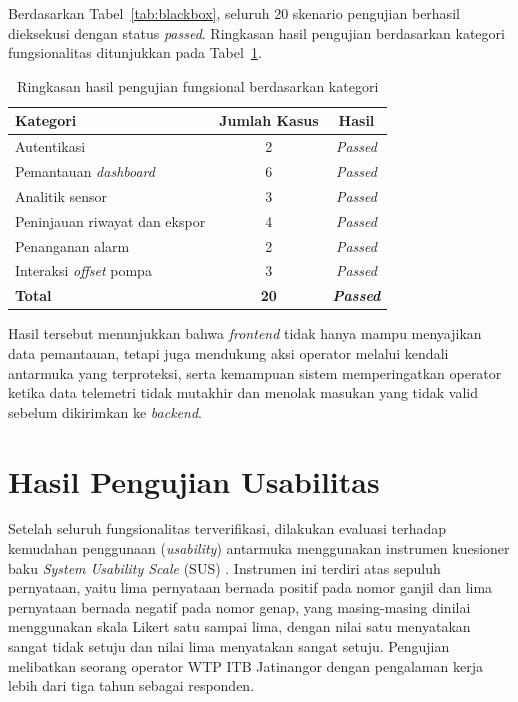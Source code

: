 

Berdasarkan Tabel~\ref{tab:blackbox}, seluruh 20 skenario pengujian berhasil dieksekusi dengan status 
\textit{passed}. Ringkasan hasil pengujian berdasarkan kategori fungsionalitas ditunjukkan pada 
Tabel~\ref{tab:ringkasan-uji}.

\begin{table}[H]
\centering
\caption{Ringkasan hasil pengujian fungsional berdasarkan kategori}
\label{tab:ringkasan-uji}
\begin{tabular}{|p{6cm}|c|c|}
\hline
\textbf{Kategori} & \textbf{Jumlah Kasus} & \textbf{Hasil} \\ \hline
Autentikasi & 2 & \textit{Passed} \\ \hline
Pemantauan \textit{dashboard} & 6 & \textit{Passed} \\ \hline
Analitik sensor & 3 & \textit{Passed} \\ \hline
Peninjauan riwayat dan ekspor & 4 & \textit{Passed} \\ \hline
Penanganan alarm & 2 & \textit{Passed} \\ \hline
Interaksi \textit{offset} pompa & 3 & \textit{Passed} \\ \hline
\textbf{Total} & \textbf{20} & \textbf{\textit{Passed}} \\ \hline
\end{tabular}
\end{table}

Hasil tersebut menunjukkan bahwa \textit{frontend} tidak hanya mampu menyajikan data pemantauan, tetapi juga 
mendukung aksi operator melalui kendali antarmuka yang terproteksi, serta kemampuan sistem memperingatkan operator ketika 
data telemetri tidak mutakhir dan menolak masukan yang tidak valid sebelum dikirimkan ke \textit{backend}.

\section{Hasil Pengujian Usabilitas}
Setelah seluruh fungsionalitas terverifikasi, dilakukan evaluasi terhadap kemudahan penggunaan (\textit{usability})
antarmuka menggunakan instrumen kuesioner baku \textit{System Usability Scale} (SUS) \autocite{brooke1996sus}.
Instrumen ini terdiri atas sepuluh pernyataan, yaitu lima pernyataan bernada positif pada nomor ganjil dan lima
pernyataan bernada negatif pada nomor genap, yang masing-masing dinilai menggunakan skala Likert satu sampai lima,
dengan nilai satu menyatakan sangat tidak setuju dan nilai lima menyatakan sangat setuju. Pengujian melibatkan seorang operator WTP ITB 
Jatinangor dengan pengalaman kerja lebih dari tiga tahun sebagai responden.

